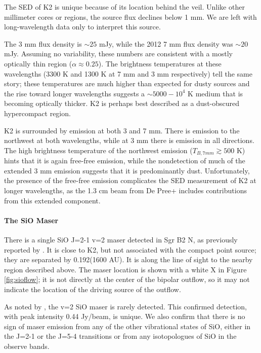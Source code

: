 \documentclass[twocolumn]{aastex61}
\begin{document}
The SED of K2 is unique because of its location behind the veil.  Unlike other
millimeter cores or \hii regions, the source flux declines below 1 mm.  We are
left with long-wavelength data only to interpret this source.

The 3 mm flux density is $\sim25$ mJy, while the 2012 7 mm flux density was
$\sim20$ mJy.  Assuming no variability, these numbers are consistent with a
mostly optically thin \hii region ($\alpha\approx0.25$).  The brightness
temperatures at these wavelengths (3300 K and 1300 K at 7 mm and 3 mm
respectively) tell the same story; these temperatures are much higher than
expected for dusty sources and the rise toward longer wavelengths suggests a
$\sim5000-10^4$ K medium that is becoming optically thicker.
K2 is perhaps best described as a dust-obscured hypercompact \hii region.

K2 is surrounded by emission at both 3 and 7 mm.  There is emission to the
northwest at both wavelengths, while at 3 mm there is emission in all
directions.  The high brightness temperature of the northwest emission ($T_{B,7
mm}\gtrsim500$ K) hints that it is again free-free emission, while the
nondetection of much of the extended 3 mm emission suggests that it is
predominantly dust.  Unfortunately, the presence of the free-free emission complicates
the SED measurement of K2 at longer wavelengths, as the 1.3 cm beam from De Pree+
includes contributions from this extended component.

\paragraph{The SiO Maser}
There is a single SiO J=2-1 v=2 maser detected in Sgr B2 N, as previously
reported by \citet{Higuchi2015a}.  It is close to K2,
but not associated with the compact point source; they are separated
by 0.192\arcsec (1600 AU).  It is along the
line of sight to the nearby \hii region described above.
The maser location is shown with a white X in Figure \ref{fig:sioflow}; it is
not directly at the center of the bipolar outflow, so it may not indicate
the location of the driving source of the outflow.

As noted by \citet{Higuchi2015a}, the v=2 SiO maser is rarely detected.  This
confirmed detection, with peak intensity 0.44 Jy/beam, is unique.  We also
confirm that there is no sign of maser emission from any of the other
vibrational states of SiO, either in the J=2-1 or the J=5-4 transitions
or from any isotopologues of SiO in the observe bands.
\end{document}
